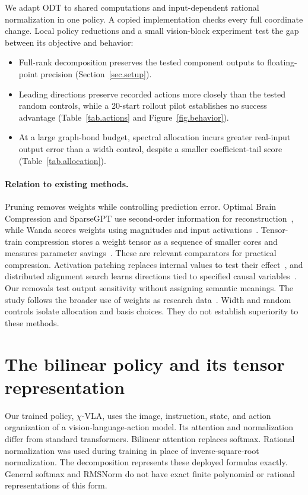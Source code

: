 \documentclass{article}
\newcommand{\chiVLA}{$\chi$-VLA}
\begin{document}
We adapt ODT to shared computations and input-dependent rational normalization in one policy. A copied implementation checks every full coordinate change. Local policy reductions and a small vision-block experiment test the gap between its objective and behavior:
\begin{itemize}
\item Full-rank decomposition preserves the tested component outputs to floating-point precision (Section~\ref{sec.setup}).
\item Leading directions preserve recorded actions more closely than the tested random controls, while a 20-start rollout pilot establishes no success advantage (Table~\ref{tab.actions} and Figure~\ref{fig.behavior}).
\item At a large graph-bond budget, spectral allocation incurs greater real-input output error than a width control, despite a smaller coefficient-tail score (Table~\ref{tab.allocation}).
\end{itemize}

\paragraph{Relation to existing methods.}
Pruning removes weights while controlling prediction error. Optimal Brain Compression and SparseGPT use second-order information for reconstruction~\citep{frantar2022,frantar2023}, while Wanda scores weights using magnitudes and input activations~\citep{sun2024}. Tensor-train compression stores a weight tensor as a sequence of smaller cores and measures parameter savings~\citep{novikov2015}. These are relevant comparators for practical compression. Activation patching replaces internal values to test their effect~\citep{zhang2024}, and distributed alignment search learns directions tied to specified causal variables~\citep{geiger2024}. Our removals test output sensitivity without assigning semantic meanings. The study follows the broader use of weights as research data~\citep{wsl2025}. Width and random controls isolate allocation and basis choices. They do not establish superiority to these methods.

\section{The bilinear policy and its tensor representation}
\label{sec.architecture}

Our trained policy, \chiVLA{}, uses the image, instruction, state, and action organization of a vision-language-action model. Its attention and normalization differ from standard transformers. Bilinear attention replaces softmax. Rational normalization was used during training in place of inverse-square-root normalization. The decomposition represents these deployed formulas exactly. General softmax and RMSNorm do not have exact finite polynomial or rational representations of this form.
\end{document}

